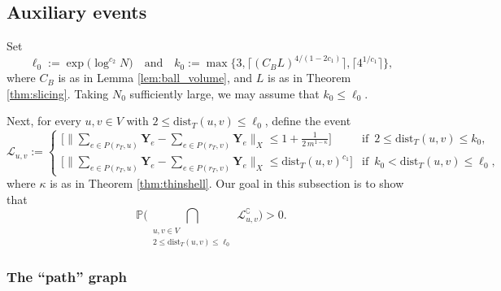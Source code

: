 \documentclass[11pt,leqno]{amsart}
\theoremstyle{remark}
\theoremstyle{plain}
\begin{document}
\subsection{Auxiliary events}

Set
\begin{equation} \label{eq:009}
\ell_0 := \exp\big( \log^{c_2}N\big) \ \ \ \text{ and } \ \ \
k_0:= \max\Big\{ 3,\big\lceil (C_BL)^{4/(1-2c_1)}\big\rceil, \big\lceil 4^{1/c_1}\big\rceil \Big\},
\end{equation}
where $C_B$ is as in Lemma \ref{lem:ball_volume}, and $L$ is as in Theorem \ref{thm:slicing}.
Taking $N_0$ sufficiently large, we may assume that $k_0\leqslant \ell_0$.

Next, for every $u,v\in V$ with $2\leqslant \mathrm{dist}_T(u,v) \leqslant \ell_0$, define the event
\[ \mathcal{L}_{u,v}:=
\begin{cases}
\Big[ \big\| \underset{e\in P(r_T,u)}{\sum} \mathbf{Y}_e - \underset{e\in P(r_T,v)}{\sum} \mathbf{Y}_e \big\|_X
\leqslant 1+\frac{1}{2\, m^{1-\kappa}} \Big] & \text{if } \, 2\leqslant \mathrm{dist}_T(u,v) \leqslant k_0, \\
\Big[ \big\| \underset{e\in P(r_T,u)}{\sum} \mathbf{Y}_e - \underset{e\in P(r_T,v)}{\sum} \mathbf{Y}_e\big\|_X
\leqslant \mathrm{dist}_T(u,v)^{c_1} \Big] & \text{if } \, k_0<\mathrm{dist}_T(u,v) \leqslant \ell_0,
\end{cases} \]
where $\kappa$ is as in Theorem \ref{thm:thinshell}. Our goal in this subsection is to show that
\begin{equation} \label{eq:010}
\mathbb{P}\Bigg( \bigcap_{\substack{ u,v\in V \\ 2\leqslant\mathrm{dist}_T(u,v)\leqslant\ell_0 }}
\mathcal{L}_{u,v}^{\complement}\Bigg)>0.
\end{equation}

\subsubsection{The ``path'' graph}
\end{document}
